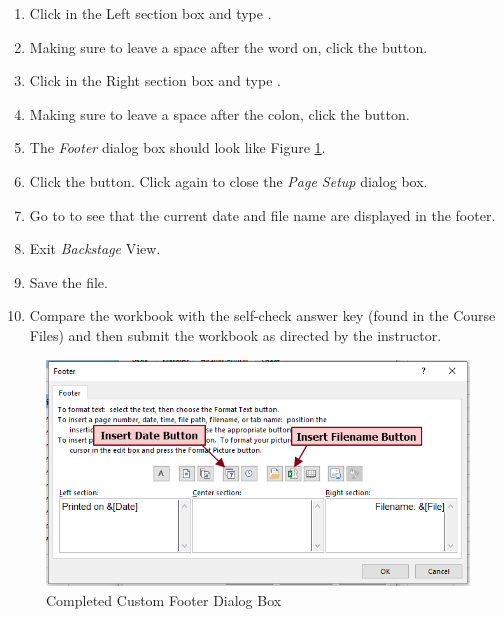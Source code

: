 \begin{enumerate}
	\item Click in the Left section box and type .
	\item Making sure to leave a space after the word on, click the  button.
	\item Click in the Right section box and type .
	\item Making sure to leave a space after the colon, click the  button.
	\item The \textit{Footer} dialog box should look like Figure \ref{02:fig46}.
	\item Click the  button. Click  again to close the \textit{Page Setup} dialog box.
	\item Go to  to see that the current date and file name are displayed in the footer.
	\item Exit \textit{Backstage} View. 
	\item Save the  file.
	\item Compare the workbook with the self-check answer key (found in the Course Files) and then submit the  workbook as directed by the instructor.
\end{enumerate}

\begin{figure}[H]
	\centering
	\includegraphics[width=\maxwidth{.95\linewidth}]{gfx/ch02_fig46}
	\caption{Completed Custom Footer Dialog Box}
	\label{02:fig46}
\end{figure}


